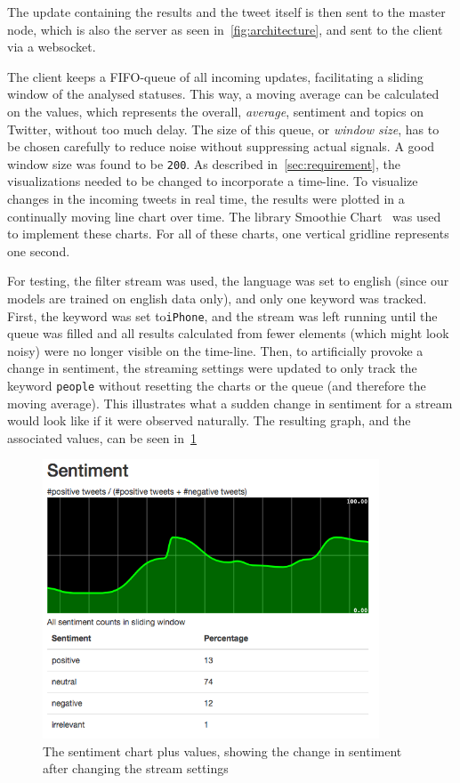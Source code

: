 The update containing the results and the tweet itself is then sent to the master node,
which is also the server as seen in~\ref{fig:architecture},
and sent to the client via a websocket.
\par
The client keeps a FIFO-queue of all incoming updates, facilitating a sliding window of the analysed statuses.
This way, a moving average can be calculated on the values, which represents the overall, \textit{average},
sentiment and topics on Twitter, without too much delay.
The size of this queue, or \textit{window size}, has to be chosen carefully to reduce noise without suppressing actual signals.
A good window size was found to be \texttt{200}.
As described in~\ref{sec:requirement}, the visualizations needed to be changed to incorporate a time-line.
To visualize changes in the incoming tweets in real time, the results were plotted in a continually moving line chart over time.
The library Smoothie Chart~\cite{smoothieDocs} was used to implement these charts.
For all of these charts, one vertical gridline represents one second.
\par %
For testing, the filter stream was used,
the language was set to english (since our models are trained on english data only),
and only one keyword was tracked.
First, the keyword was set to\texttt{iPhone},
and the stream was left running until the queue was filled and all results calculated from fewer elements
(which might look noisy) were no longer visible on the time-line. %
Then, to artificially provoke a change in sentiment,
the streaming settings were updated to only track the keyword \texttt{people} without resetting the charts or the queue (and therefore the moving average).
This illustrates what a sudden change in sentiment for a stream would look like if it were observed naturally.
The resulting graph, and the associated values, can be seen in~\ref{fig:dashboard-sentiment}

\begin{figure}
    \centering
    \caption{The sentiment chart plus values, showing the change in sentiment after changing the stream settings}
    \label{fig:dashboard-sentiment}
    \includegraphics[width=10cm]{../images/dashboard_sentiment.png}
\end{figure}

